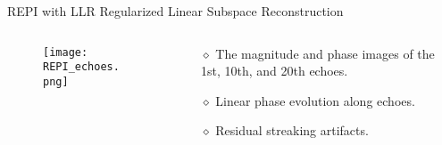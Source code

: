 \begin{frame}{REPI with LLR Regularized Linear Subspace Reconstruction}
\begin{columns}
\begin{column}{0.6\textwidth}
\begin{figure}
	\texttt{[image: REPI\_echoes.png]}
\end{figure}
\end{column}

\begin{column}{0.4\textwidth}
{\large
\begin{itemize}
	\item [$\diamond$] The magnitude and phase images 
	of the 1st, 10th, and 20th echoes.
	\vspace{2em}
	\item [$\diamond$] Linear phase evolution along echoes.
	\vspace{2em}
	\item [$\diamond$] Residual streaking artifacts.
\end{itemize}}
\end{column}
\end{columns}
\end{frame}